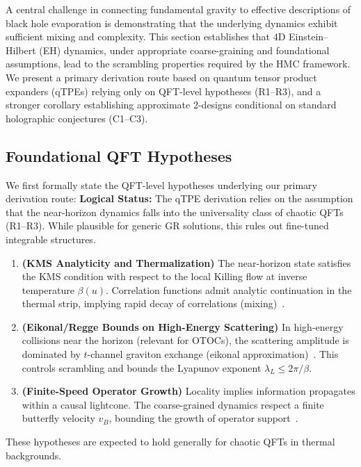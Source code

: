 \documentclass[aps,prd,preprint,onecolumn,superscriptaddress,nofootinbib,longbibliography,floatfix,11pt,showpacs,showkeys]{revtex4-2}
\theoremstyle{plain}
\theoremstyle{definition}
\theoremstyle{remark}
\begin{document}
A central challenge in connecting fundamental gravity to effective descriptions of black hole evaporation is demonstrating that the underlying dynamics exhibit sufficient mixing and complexity. This section establishes that 4D Einstein--Hilbert (EH) dynamics, under appropriate coarse-graining and foundational assumptions, lead to the scrambling properties required by the HMC framework. We present a primary derivation route based on quantum tensor product expanders (qTPEs) relying only on QFT-level hypotheses (R1--R3), and a stronger corollary establishing approximate 2-designs conditional on standard holographic conjectures (C1--C3).

\subsection{Foundational QFT Hypotheses}
We first formally state the QFT-level hypotheses underlying our primary derivation route:
\textbf{Logical Status:} The qTPE derivation relies on the assumption that the near-horizon dynamics falls into the universality class of chaotic QFTs (R1--R3). While plausible for generic GR solutions, this rules out fine-tuned integrable structures.

\begin{enumerate}[label=\textbf{R\arabic*}:,leftmargin=*]
  \item \textbf{(KMS Analyticity and Thermalization)} The near-horizon state satisfies the KMS condition with respect to the local Killing flow at inverse temperature $\beta(u)$. Correlation functions admit analytic continuation in the thermal strip, implying rapid decay of correlations (mixing)~\cite{Haag:1992}.
  \item \textbf{(Eikonal/Regge Bounds on High-Energy Scattering)} In high-energy collisions near the horizon (relevant for OTOCs), the scattering amplitude is dominated by $t$-channel graviton exchange (eikonal approximation)~\cite{tHooft:1987,AmatiCiafaloniVeneziano:1989}. This controls scrambling and bounds the Lyapunov exponent $\lambda_L \le 2\pi/\beta$.
  \item \textbf{(Finite-Speed Operator Growth)} Locality implies information propagates within a causal lightcone. The coarse-grained dynamics respect a finite butterfly velocity $v_B$, bounding the growth of operator support~\cite{ShenkerStanford:2014}.
\end{enumerate}
These hypotheses are expected to hold generally for chaotic QFTs in thermal backgrounds.
\end{document}
